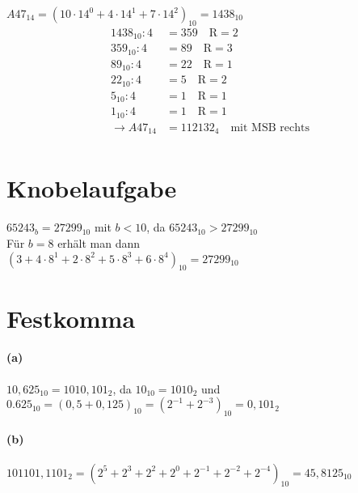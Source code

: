 \documentclass[a4paper]{article}
\begin{document}
$A47_{14} = (10\cdot14^0+4\cdot14^1+7\cdot14^2)_{10} = 1438_{10}$
\begin{align*}
	1438_{10} :4 &= 359 \quad \text{R} = 2\\
	359_{10} : 4 &= 89 \quad \text{R} = 3\\
	89_{10} : 4 &= 22 \quad \text{R} = 1\\
	22_{10} : 4 &= 5 \quad \text{R} = 2\\
	5_{10} : 4 &= 1 \quad \text{R} = 1\\
	1_{10} : 4 &= 1 \quad \text{R} = 1\\
	\rightarrow A47_{14} &= 112132_4 \quad \text{mit MSB rechts}\\
\end{align*}


\section{Knobelaufgabe}
$65243_b = 27299_{10}$ mit $b<10$, da $65243_{10} > 27299_{10}$\\
Für $b=8$ erhält man dann\\
$(3+4\cdot8^1+2\cdot8^2+5\cdot8^3+6\cdot8^4)_{10} = 27299_{10}$


\section{Festkomma}
\paragraph{(a)}
$10,625_{10} = 1010,101_2$, da
$10_{10} = 1010_2$ und $0.625_{10} = (0,5+0,125)_{10} = (2^{-1}+2^{-3})_{10} = 0,101_2$

\paragraph{(b)}
$101101,1101_2 = (2^5+2^3+2^2+2^0+2^{-1}+2^{-2}+2^{-4})_{10} = 45,8125_{10}$
\end{document}
